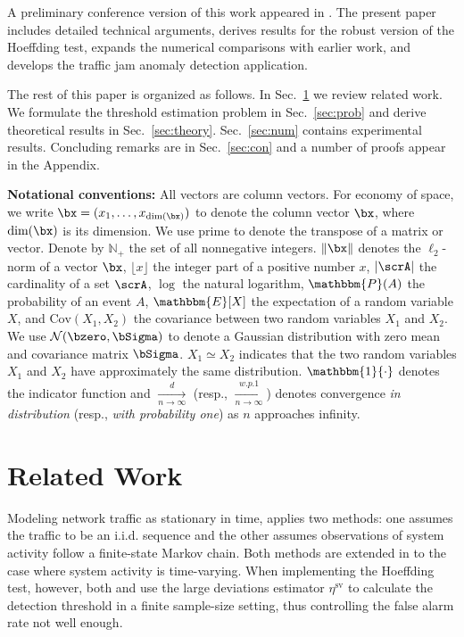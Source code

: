\documentclass[10pt, twocolumn]{IEEEtran}
\begin{document}
A preliminary conference version of this work appeared in
\cite{zh-pas-cdc15}. The present paper includes detailed technical
arguments, derives results for the robust version of the Hoeffding test,
expands the numerical comparisons with earlier work, and develops the
traffic jam anomaly detection application.

The rest of this paper is organized as follows. In Sec.~\ref{sec:liter}
we review related work. We formulate the threshold estimation problem in
Sec.~\ref{sec:prob} and derive theoretical results in
Sec.~\ref{sec:theory}. Sec.~\ref{sec:num} contains experimental
results. Concluding remarks are in Sec.~\ref{sec:con} and a number of
proofs appear in the Appendix.

\textbf{Notational conventions:} All vectors are column vectors. For
economy of space, we write $\bx = (x_1, \ldots, x_{\text{dim}(\bx)})$ to
denote the column vector $\bx$, where $\text{dim}(\bx)$ is its
dimension. We use prime to denote the transpose of a matrix or
vector. Denote by $\mathbb{N_+}$ the set of all nonnegative
integers. {$\|\bx\|$ denotes the $\ell_2$-norm of a vector $\bx$,
  $\lfloor x \rfloor$ the integer part of a positive number $x$, $|
  \scrA |$ the cardinality of a set $\scrA$}, $\log$ the natural
logarithm, $\mathbbm{P}(A)$ the probability of an event $A$,
$\mathbbm{E}[X]$ the expectation of a random variable $X$, and
$\text{Cov}(X_1, X_2)$ the covariance between two random variables $X_1$
and $X_2$. We use $\mathcal{N}(\bzero, \bSigma)$ to denote a Gaussian
distribution with zero mean and covariance matrix $\bSigma$. $X_1 \simeq
X_2$ indicates that the two random variables $X_1$ and $X_2$ have
approximately the same distribution. $\mathbbm{1}\{\cdot\}$ denotes the
indicator function and $\xrightarrow[{n \to \infty }]{\textit{d}}$
(resp., $\xrightarrow[{n \to \infty }]{{\textit{w.p.1}}}$) denotes
convergence \textit{in distribution} (resp., \textit{with probability
  one}) as $n$ approaches infinity.


\section{Related Work} \label{sec:liter} 

Modeling network traffic as stationary in time, \cite{pas-sma-ton-09}
applies two methods: one assumes the traffic to be an i.i.d.  sequence
and the other assumes observations of system activity follow a
finite-state Markov chain. Both methods are extended in
\cite{robust-anomaly-tcns} to the case where system activity is
time-varying. When implementing the Hoeffding test, however, both
\cite{pas-sma-ton-09} and \cite{robust-anomaly-tcns} use the large deviations estimator
$\eta^{\text{sv}}$ to calculate the detection threshold in a finite sample-size setting, thus controlling the false alarm rate not well enough.
 
\end{document}
